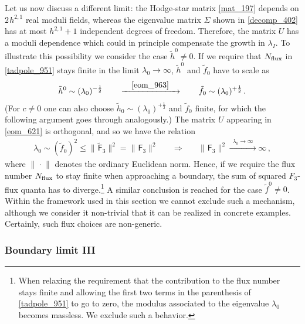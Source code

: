 \documentclass[12pt,a4paper]{article}
\newcommand{\eq}[1]{\begin{equation}
                     \begin{split} #1 \end{split}
                     \end{equation}}
\newcommand{\op}{\hspace{1pt}}
\numberwithin{equation}{section}
\begin{document}
Let us now discuss a different limit: the Hodge-star matrix \eqref{mat_197} 
depends on $2\op h^{2,1}$ real moduli fields, whereas the 
eigenvalue matrix $\Sigma$ shown in \eqref{decomp_402} has
at most $h^{2,1}+1$ independent degrees of freedom. 
Therefore, the  matrix $U$ has a moduli dependence which 
could in principle compensate the growth in $\lambda_I$. 
To illustrate this possibility we  consider the case 
$\tilde{ h}^0\neq0$. If we require that $N_{\rm flux}$ in \eqref{tadpole_951}
stays finite in the limit $\lambda_0\to\infty$,
$\tilde{ h}^0$ and $\tilde f_0$ have to scale as 
\eq{
  \tilde{ h}^0 \sim (\lambda_0)^{-\frac{1}{2}}
  \qquad\xrightarrow{\quad \eqref{eom_963} \quad}\qquad
  \tilde{ f}_0 \sim (\lambda_0)^{+\frac{1}{2}} \,.
}
(For $c\neq0$ one can also choose $ \tilde{ h}_0 \sim (\lambda_0)^{+\frac{1}{2}} $
and $\tilde f_0$ finite, 
for which the following argument goes through analogously.)
The matrix $U$ appearing in \eqref{eom_621} is orthogonal, and so we have the relation
\eq{
  \label{tad_8883}
  \lambda_0 \sim   (\tilde{ f}_0)^2 \leq \lVert \op\widetilde{\mathsf F}_3 \rVert^2
  =  \lVert \op\mathsf F_3 \rVert^2 
  \hspace{20pt}\Longrightarrow\hspace{20pt}
  \lVert \op\mathsf F_3 \rVert^2 
  \xrightarrow{\hspace{6pt}\lambda_0\to \infty\hspace{6pt}} \infty \,,
}
where $\lVert\op \cdot\op\rVert$ denotes the ordinary Euclidean norm. 
Hence, if we require the flux number $N_{\rm flux}$ to stay finite when approaching 
a boundary, the sum of squared $F_3$-flux quanta 
has to diverge.\footnote{When relaxing the requirement that 
the contribution to the flux number stays finite  and allowing the first two terms in 
the parenthesis of \eqref{tadpole_951} to go to zero, the modulus 
associated to the eigenvalue $\lambda_0$ becomes massless. 
We exclude such a behavior.}
A similar conclusion is reached for the case $\tilde{ f}^0\neq0$. 
Within the framework used in this section we cannot exclude such a mechanism, 
although we consider it non-trivial  that it can be realized in concrete examples.
Certainly, such flux choices are non-generic.





\subsubsection*{Boundary limit III}
\end{document}
